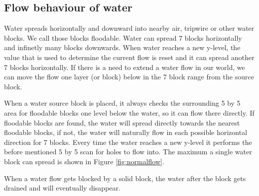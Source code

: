 \subsection{Flow behaviour of water} \label{waterflow}
Water spreads horizontally and downward into nearby air, tripwire or other water blocks. We call those blocks floodable. Water can spread 7 blocks horizontally and infinetly many blocks downwards. When water reaches a new y-level, the value that is used to determine the current flow is reset and it can spread another 7 blocks horizontally. If there is a need to extend a water flow in our world, we can move the flow one layer (or block) below in the 7 block range from the source block.

When a water source block is placed, it always checks the surrounding 5 by 5 area for floodable blocks one level below the water, so it can flow there directly. If floodable blocks are found, the water will spread directly towards the nearest floodable blocks, if not, the water will naturally flow in each possible horizontal direction for 7 blocks. Every time the water reaches a new y-level it performs the before mentioned 5 by 5 scan for holes to flow into. The maximum a single water block can spread is shown in Figure \ref{fig:normalflow}.

When a water flow gets blocked by a solid block, the water after the block gets drained and will eventually disappear.

